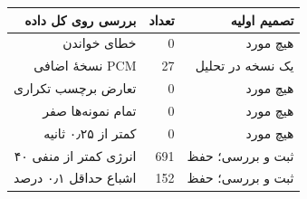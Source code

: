 \begin{center}
\begin{tabular}{rrr}
\toprule
بررسی روی کل داده & تعداد & تصمیم اولیه \\
\midrule
خطای خواندن & 0 & هیچ مورد \\
نسخهٔ اضافی PCM & 27 & یک نسخه در تحلیل \\
تعارض برچسب تکراری & 0 & هیچ مورد \\
تمام نمونه‌ها صفر & 0 & هیچ مورد \\
کمتر از ۰٫۲۵ ثانیه & 0 & هیچ مورد \\
انرژی کمتر از منفی ۴۰ & 691 & ثبت و بررسی؛ حفظ \\
اشباع حداقل ۰٫۱ درصد & 152 & ثبت و بررسی؛ حفظ \\
\bottomrule
\end{tabular}
\end{center}
